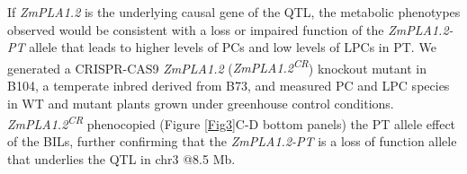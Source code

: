 \documentclass[9pt,twocolumn,twoside,lineno]{BioRxiv}
\begin{document}
If \textit{ZmPLA1.2} is the underlying causal gene of the QTL, the metabolic phenotypes observed would be consistent with a loss or impaired function of the \textit{ZmPLA1.2-PT} allele that leads to higher levels of PCs and low levels of LPCs in PT. 
We generated a CRISPR-CAS9 \textit{ZmPLA1.2} (\textit{ZmPLA1.2\textsuperscript{CR}}) knockout mutant in B104, a temperate inbred derived from B73, and measured PC and LPC species in WT and mutant plants grown under greenhouse control conditions. 
\textit{ZmPLA1.2\textsuperscript{CR}} phenocopied (Figure \ref{Fig3}C-D bottom panels) the PT allele effect of the BILs, further confirming that the \textit{ZmPLA1.2-PT} is a loss of function allele that underlies the QTL in chr3 @8.5 Mb. 
\end{document}
